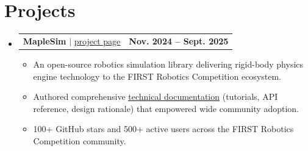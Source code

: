 \documentclass[letterpaper,11pt]{article}
\makeatletter
\newcommand{\resumeItem}[1]{
  \item\small{
    {#1 \vspace{-2pt}}
  }
}
\newcommand{\resumeProjectHeading}[2]{
    \item
    \begin{tabular*}{0.97\textwidth}{l@{\extracolsep{\fill}}r}
      \color{SubTitleBlue}\small#1 & \color{SubTitleBlue}\textbf{#2} \\
    \end{tabular*}\vspace{-7pt}
}
\newcommand{\resumeSubHeadingListStart}{\begin{itemize}[leftmargin=0.15in, label={}]}
\newcommand{\resumeSubHeadingListEnd}{\end{itemize}}
\newcommand{\resumeItemListStart}{\begin{itemize}}
\newcommand{\resumeItemListEnd}{\end{itemize}\vspace{-5pt}}
\makeatother
\begin{document}
\section{Projects}
    \resumeSubHeadingListStart
      \resumeProjectHeading
          {\textbf{MapleSim} $|$ \underline{\href{https://github.com/Shenzhen-Robotics-Alliance/maple-sim}{project page}}}{Nov. 2024 -- Sept. 2025}
          \resumeItemListStart
            \resumeItem{An open-source robotics simulation library delivering rigid-body physics engine technology to the FIRST Robotics Competition ecosystem.}
            \resumeItem{Authored comprehensive \underline{\href{https://shenzhen-robotics-alliance.github.io/maple-sim/}{technical documentation}} (tutorials, API reference, design rationale) that empowered wide community adoption.}
            \resumeItem{100+ GitHub stars and 500+ active users across the FIRST Robotics Competition community.}
          \resumeItemListEnd
    \resumeSubHeadingListEnd

\end{document}

